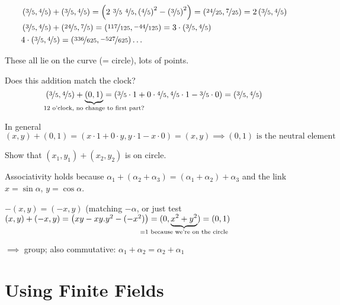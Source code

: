 \begin{example}
\begin{align*}
&\left(\nicefrac{3}{5},\nicefrac{4}{5} \right) + \left(\nicefrac{3}{5},\nicefrac{4}{5} \right)= \left(2 \,\, \nicefrac{3}{5} \,\, \nicefrac{4}{5},\left(\nicefrac{4}{5}\right)^2 - \left(\nicefrac{3}{5}\right)^2\right) = \left(\nicefrac{24}{25},\nicefrac{7}{25} \right) = 2 \left(\nicefrac{3}{5},\nicefrac{4}{5} \right) \\
&\left(\nicefrac{3}{5},\nicefrac{4}{5} \right) + \left(\nicefrac{24}{5},\nicefrac{7}{5} \right)= \left(\nicefrac{117}{125},\nicefrac{-44}{125} \right) = 3 \cdot \left(\nicefrac{3}{5},\nicefrac{4}{5} \right) \\
&4 \cdot \left(\nicefrac{3}{5},\nicefrac{4}{5}\right) = \left(\nicefrac{336}{625},\nicefrac{-527}{625} \right) \dots
\end{align*}
\end{example}

These all lie on the curve (= circle), lots of points.

Does this addition match the clock? 
\[
\left(\nicefrac{3}{5},\nicefrac{4}{5} \right) + \underbrace{\left(0,1\right)}_{\mathclap{\text{12 o'clock, no change to first part?}}} = \left(\nicefrac{3}{5} \cdot 1 + 0 \cdot \nicefrac{4}{5},\nicefrac{4}{5} \cdot 1 - \nicefrac{3}{5} \cdot 0 \right) = \left(\nicefrac{3}{5},\nicefrac{4}{5} \right)
\]

In general
\[
\left(x,y \right) + \left(0,1\right) = \left(x \cdot 1 + 0 \cdot y, y\cdot 1 - x \cdot 0 \right) = \left(x,y \right) \implies \left(0,1\right) \text{ is the neutral element}
\]

Show that $\left(x_1,y_1\right) + \left(x_2,y_2\right)$ is on circle.

Associativity holds because $\alpha_1 + (\alpha_2 + \alpha_3) = (\alpha_1 + \alpha_2) + \alpha_3$ and the link $x=\sin \alpha$, $y=\cos \alpha$.

$-\left(x,y\right) = \left(-x,y\right)$ (matching $-\alpha$, or just test $\left(x,y\right) + \left(-x,y\right) = \left(xy - xy. y^2 - (-x^2)\right) = (0,\underbrace{x^2+y^2}_{\mathclap{=1 \text{ because we're on the circle}}}) = \left(0,1\right)$

$\implies$ group; also commutative: $\alpha_1 + \alpha_2 = \alpha_2 + \alpha_1$ 

\section{Using Finite Fields}

